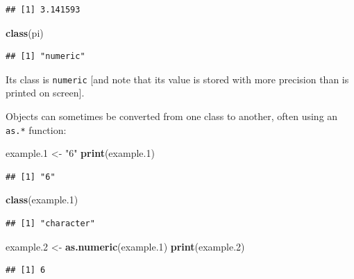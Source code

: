 \documentclass[]{article}
\newenvironment{Shaded}{\begin{snugshade}}{\end{snugshade}}
\newcommand{\FloatTok}[1]{\textcolor[rgb]{0.00,0.00,0.81}{#1}}
\newcommand{\KeywordTok}[1]{\textcolor[rgb]{0.13,0.29,0.53}{\textbf{#1}}}
\newcommand{\NormalTok}[1]{#1}
\newcommand{\StringTok}[1]{\textcolor[rgb]{0.31,0.60,0.02}{#1}}
\begin{document}
\begin{verbatim}
## [1] 3.141593
\end{verbatim}

\begin{Shaded}
\begin{Highlighting}[]
\KeywordTok{class}\NormalTok{(pi)}
\end{Highlighting}
\end{Shaded}

\begin{verbatim}
## [1] "numeric"
\end{verbatim}

Its class is \texttt{numeric} {[}and note that its value is stored with more precision than is printed on screen{]}.

Objects can sometimes be converted from one class to another, often using an \texttt{as.*} function:

\begin{Shaded}
\begin{Highlighting}[]
\NormalTok{example}\FloatTok{.1}\NormalTok{ <-}\StringTok{ "6"}
\KeywordTok{print}\NormalTok{(example}\FloatTok{.1}\NormalTok{)}
\end{Highlighting}
\end{Shaded}

\begin{verbatim}
## [1] "6"
\end{verbatim}

\begin{Shaded}
\begin{Highlighting}[]
\KeywordTok{class}\NormalTok{(example}\FloatTok{.1}\NormalTok{)}
\end{Highlighting}
\end{Shaded}

\begin{verbatim}
## [1] "character"
\end{verbatim}

\begin{Shaded}
\begin{Highlighting}[]
\NormalTok{example}\FloatTok{.2}\NormalTok{ <-}\StringTok{ }\KeywordTok{as.numeric}\NormalTok{(example}\FloatTok{.1}\NormalTok{)}
\KeywordTok{print}\NormalTok{(example}\FloatTok{.2}\NormalTok{)}
\end{Highlighting}
\end{Shaded}

\begin{verbatim}
## [1] 6
\end{verbatim}
\end{document}
